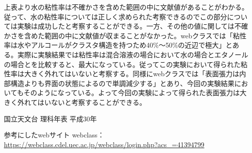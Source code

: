 \documentclass{jsarticle}
\begin{document}
上表より水の粘性率は不確かさを含めた範囲の中に文献値があることがわかる。従って、水の粘性率については正しく求められた考察できるのでこの部分については実験は成功したと考察することができる。一方、その他の値に関しては不確かさを含めた範囲の中に文献値が収まることがなかった。webクラスでは「粘性率は水やアルコールがクラスタ構造を持つため40\%〜50\%の近辺で極大」とある。実際に実験結果では粘性率は混合溶液の場合において水の場合とエタノールの場合とを比較すると、最大になっている。従ってこの実験において得られた粘性率は大きく外れてはいないと考察する。同様にwebクラスでは「表面張力は内部構造よりも界面の状態によるので単調減少する」とあり、今回の実験結果においてもそのようになっている。よって今回の実験によって得られた表面張力は大きく外れてはいないと考察することができる。


\begin{thebibliography}{99}
     国立天文台 理科年表 平成30年
\end{thebibliography}
参考にしたwebサイト
    webclass：\url{https://webclass.cdel.uec.ac.jp/webclass/login.php?acs_=41394799}
\end{document}
